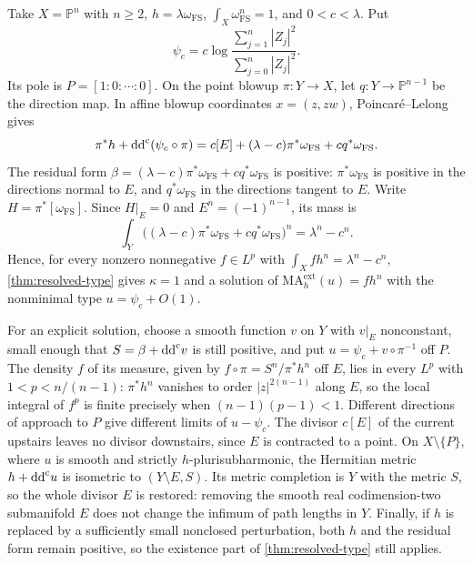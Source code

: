\begin{example}\label{ex:projective-point-nonminimal}
Take $X=\mathbb P^n$ with $n\geq2$, $h=\lambda\omega_{\mathrm{FS}}$, $\int_X\omega_{\mathrm{FS}}^n=1$, and $0<c<\lambda$. Put
\[
 \psi_c=c\log\frac{\sum_{j=1}^n|Z_j|^2}{\sum_{j=0}^n|Z_j|^2}.
\]
Its pole is $P=[1:0:\cdots:0]$. On the point blowup $\pi\colon Y\to X$, let $q\colon Y\to\mathbb P^{n-1}$ be the direction map. In affine blowup coordinates $x=(z,zw)$, Poincar\'e--Lelong gives
\[
 \pi^*h+\mathrm{dd}^{\mathrm{c}}(\psi_c\circ\pi)
 =c[E]+(\lambda-c)\pi^*\omega_{\mathrm{FS}}+cq^*\omega_{\mathrm{FS}}.
\]
The residual form $\beta=(\lambda-c)\pi^*\omega_{\mathrm{FS}}+cq^*\omega_{\mathrm{FS}}$ is positive: $\pi^*\omega_{\mathrm{FS}}$ is positive in the directions normal to $E$, and $q^*\omega_{\mathrm{FS}}$ in the directions tangent to $E$. Write $H=\pi^*[\omega_{\mathrm{FS}}]$. Since $H|_E=0$ and $E^n=(-1)^{n-1}$, its mass is
\begin{equation}\label{eq:point-residual-mass}
 \int_Y\bigl((\lambda-c)\pi^*\omega_{\mathrm{FS}}+cq^*\omega_{\mathrm{FS}}\bigr)^n=\lambda^n-c^n.
\end{equation}
Hence, for every nonzero nonnegative $f\in L^p$ with $\int_Xfh^n=\lambda^n-c^n$, \cref{thm:resolved-type} gives $\kappa=1$ and a solution of $\mathrm{MA}^{\mathrm{ext}}_h(u)=fh^n$ with the nonminimal type $u=\psi_c+O(1)$.

For an explicit solution, choose a smooth function $v$ on $Y$ with $v|_E$ nonconstant, small enough that $S=\beta+\mathrm{dd}^{\mathrm{c}} v$ is still positive, and put $u=\psi_c+v\circ\pi^{-1}$ off $P$. The density $f$ of its measure, given by $f\circ\pi=S^n/\pi^*h^n$ off $E$, lies in every $L^p$ with $1<p<n/(n-1)$: $\pi^*h^n$ vanishes to order $|z|^{2(n-1)}$ along $E$, so the local integral of $f^p$ is finite precisely when $(n-1)(p-1)<1$. Different directions of approach to $P$ give different limits of $u-\psi_c$. The divisor $c[E]$ of the current upstairs leaves no divisor downstairs, since $E$ is contracted to a point. On $X\setminus\{P\}$, where $u$ is smooth and strictly $h$-plurisubharmonic, the Hermitian metric $h+\mathrm{dd}^{\mathrm{c}} u$ is isometric to $(Y\setminus E,S)$. Its metric completion is $Y$ with the metric $S$, so the whole divisor $E$ is restored: removing the smooth real codimension-two submanifold $E$ does not change the infimum of path lengths in $Y$. Finally, if $h$ is replaced by a sufficiently small nonclosed perturbation, both $h$ and the residual form remain positive, so the existence part of \cref{thm:resolved-type} still applies.
\end{example}

